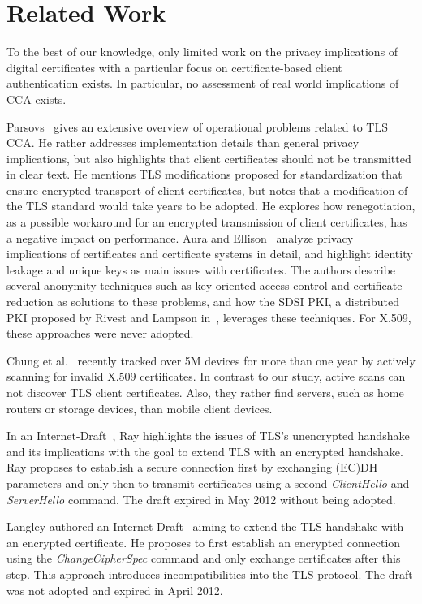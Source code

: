 \section{Related Work}
\label{sec:related}

To the best of our knowledge, only limited work on the privacy
implications of digital certificates with a particular focus on 
certificate-based client authentication exists. In particular, no assessment of
real world implications of CCA exists.

Parsovs~\cite{parsovs14clientauth} gives an extensive overview of operational problems
related to TLS CCA. He rather addresses implementation details than general privacy implications, but also highlights that
client certificates should not be transmitted in clear text.
He mentions TLS modifications proposed for standardization that ensure encrypted transport of client certificates,   
but notes that a modification of the TLS standard would take years to be adopted.
He explores how renegotiation, as a possible workaround for an encrypted transmission of client certificates, has a negative impact on performance. 
%
Aura and Ellison~\cite{Aura00privacyand} analyze privacy implications of
certificates and certificate systems in detail, and highlight identity leakage and
unique keys as main issues with certificates. The authors describe several
anonymity techniques such as key-oriented access control and certificate reduction
as solutions to these problems, and how the SDSI PKI, a distributed PKI proposed by 
Rivest and Lampson in~\cite{RivestSDSI}, leverages
these techniques. For X.509, these approaches were never adopted.

Chung et al.~\cite{chung2016measuring} recently tracked over 5M devices for more than one year by actively scanning for invalid X.509 certificates.
In contrast to our study, active scans can not discover TLS client certificates.
Also, they rather find servers, such as home routers or storage devices, than mobile client devices. 

In an Internet-Draft~\cite{TLSencRay}, Ray highlights the issues of
TLS's unencrypted handshake and its implications with the goal to extend TLS
with an encrypted handshake. Ray proposes to establish a secure connection first 
by exchanging (EC)DH parameters and only then to transmit 
certificates using a second \emph{ClientHello} and \emph{ServerHello} command. 
The draft expired in May 2012 without being adopted.

Langley authored an Internet-Draft~\cite{TLSencLangley} aiming to extend the TLS handshake
with an encrypted certificate. He proposes to first establish an encrypted
connection using the \emph{ChangeCipherSpec} command and only exchange certificates after this step. This approach introduces incompatibilities into the TLS protocol. The draft was not adopted and expired in April 2012. 

